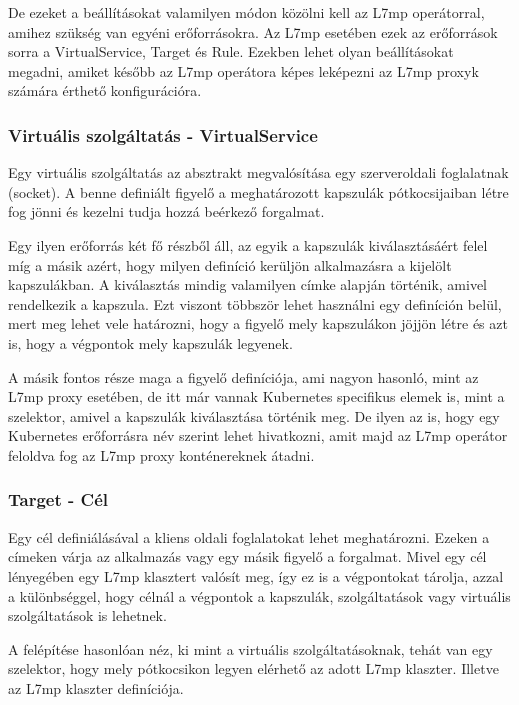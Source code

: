 De ezeket a beállításokat valamilyen módon közölni kell az L7mp operátorral, amihez 
szükség van egyéni erőforrásokra. Az L7mp esetében ezek az erőforrások sorra a 
VirtualService, Target és Rule. Ezekben lehet olyan beállításokat megadni, amiket
később az L7mp operátora képes leképezni az L7mp proxyk számára érthető konfigurációra.

\subsubsection{Virtuális szolgáltatás - VirtualService}

Egy virtuális szolgáltatás az absztrakt megvalósítása egy szerveroldali foglalatnak 
(socket). A benne definiált figyelő a meghatározott kapszulák pótkocsijaiban létre fog 
jönni és kezelni tudja hozzá beérkező forgalmat. 

Egy ilyen erőforrás két fő részből áll, az egyik a kapszulák kiválasztásáért felel míg
a másik azért, hogy milyen definíció kerüljön alkalmazásra a kijelölt kapszulákban.
A kiválasztás mindig valamilyen címke alapján történik, amivel rendelkezik a kapszula. 
Ezt viszont többször lehet használni egy definíción belül, mert meg lehet vele határozni,
hogy a figyelő mely kapszulákon jöjjön létre és azt is, hogy a végpontok mely kapszulák 
legyenek. 

A másik fontos része maga a figyelő definíciója, ami nagyon hasonló, mint az L7mp proxy
esetében, de itt már vannak Kubernetes specifikus elemek is, mint a szelektor,
amivel a kapszulák kiválasztása történik meg. De ilyen az is, hogy egy Kubernetes 
erőforrásra név szerint lehet hivatkozni, amit majd az L7mp operátor feloldva fog az L7mp
proxy konténereknek átadni.

\subsubsection{Target - Cél}

Egy cél definiálásával a kliens oldali foglalatokat lehet meghatározni. Ezeken 
a címeken várja az alkalmazás vagy egy másik figyelő a forgalmat. Mivel egy cél 
lényegében egy L7mp klasztert valósít meg, így ez is a végpontokat tárolja, azzal a 
különbséggel, hogy célnál a végpontok a kapszulák, szolgáltatások vagy virtuális 
szolgáltatások is lehetnek. 

A felépítése hasonlóan néz, ki mint a virtuális szolgáltatásoknak, tehát van egy 
szelektor, hogy mely pótkocsikon legyen elérhető az adott L7mp klaszter. Illetve az L7mp 
klaszter definíciója. 

